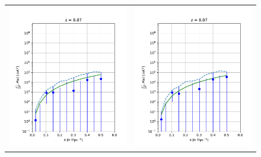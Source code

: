 \begin{figure}
\begin{tabular}{ll}
\includegraphics[scale=0.5]{chapters/psa128_pol/figures/pIn_U.pdf} &
\includegraphics[scale=0.5]{chapters/psa128_pol/figures/pIn_V.pdf} \\

\end{tabular}
\end{figure}
